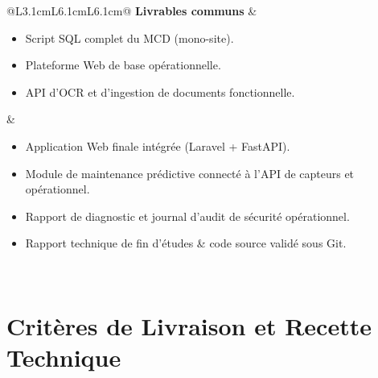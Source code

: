\documentclass[11pt,a4paper]{article}
\begin{document}
\begin{longtable}{@{}L{3.1cm}L{6.1cm}L{6.1cm}@{}}
\textbf{Livrables communs} &
\begin{minipage}[t]{\linewidth}\vspace{2pt}
\begin{itemize}[leftmargin=1em, itemsep=2pt, topsep=0pt]
  \item Script SQL complet du MCD (mono-site).
  \item Plateforme Web de base opérationnelle.
  \item API d'OCR et d'ingestion de documents fonctionnelle.
\end{itemize}\vspace{2pt}
\end{minipage} &
\begin{minipage}[t]{\linewidth}\vspace{2pt}
\begin{itemize}[leftmargin=1em, itemsep=2pt, topsep=0pt]
  \item Application Web finale intégrée (Laravel + FastAPI).
  \item Module de maintenance prédictive connecté à l'API de capteurs et opérationnel.
  \item Rapport de diagnostic et journal d'audit de sécurité opérationnel.
  \item Rapport technique de fin d'études \& code source validé sous Git.
\end{itemize}\vspace{2pt}
\end{minipage} \\

\bottomrule
\end{longtable}

\section{Critères de Livraison et Recette Technique}
\end{document}
